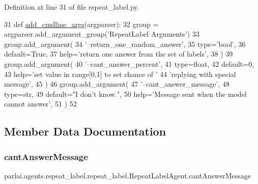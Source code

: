 Definition at line 31 of file repeat\+\_\+label.\+py.


\begin{DoxyCode}
31     \textcolor{keyword}{def }\hyperlink{namespaceparlai_1_1agents_1_1drqa_1_1config_a62fdd5554f1da6be0cba185271058320}{add\_cmdline\_args}(argparser):
32         group = argparser.add\_argument\_group(\textcolor{stringliteral}{'RepeatLabel Arguments'})
33         group.add\_argument(
34             \textcolor{stringliteral}{'--return\_one\_random\_answer'},
35             type=\textcolor{stringliteral}{'bool'},
36             default=\textcolor{keyword}{True},
37             help=\textcolor{stringliteral}{'return one answer from the set of labels'},
38         )
39         group.add\_argument(
40             \textcolor{stringliteral}{'--cant\_answer\_percent'},
41             type=float,
42             default=0,
43             help=\textcolor{stringliteral}{'set value in range[0,1] to set chance of '}
44             \textcolor{stringliteral}{'replying with special message'},
45         )
46         group.add\_argument(
47             \textcolor{stringliteral}{'--cant\_answer\_message'},
48             type=str,
49             default=\textcolor{stringliteral}{"I don't know."},
50             help=\textcolor{stringliteral}{'Message sent when the model cannot answer'},
51         )
52 
\end{DoxyCode}


\subsection{Member Data Documentation}
\mbox{\label{classparlai_1_1agents_1_1repeat__label_1_1repeat__label_1_1RepeatLabelAgent_a761b9c11bf08499c0da88de5ec9fb406}} 
\subsubsection{\texorpdfstring{cant\+Answer\+Message}{cantAnswerMessage}}
{\footnotesize\ttfamily parlai.\+agents.\+repeat\+\_\+label.\+repeat\+\_\+label.\+Repeat\+Label\+Agent.\+cant\+Answer\+Message}



